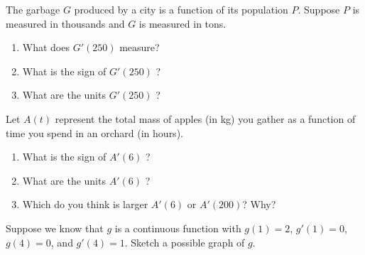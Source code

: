 \documentclass[11pt]{article}
\begin{document}
\vspace{0.2in}


The garbage $G$ produced by a city is a function of its population $P$.  Suppose $P$ is measured in thousands and
$G$ is measured in tons.  
\begin{enumerate}
\item{What does $G'(250)$ measure?}
\item{What is the sign of $G'(250)$ ?}
\item{What are the units $G'(250)$ ?}
\end{enumerate}


\vspace{0.2in}


Let $A(t)$ represent the total mass of apples (in kg) you gather as a function of time you spend in an orchard (in hours).
\begin{enumerate}
\item{What is the sign of $A'(6)$ ?}
\item{What are the units $A'(6)$ ?}
\item{Which do you think is larger $A'(6)$ or $A'(200)$?  Why? }
\end{enumerate}


\vspace{0.2in}

Suppose we know that $g$ is a continuous function with $g(1) = 2$, $g'(1) = 0$, $g(4) = 0$, and $g'(4) = 1 $.
Sketch a possible graph of $g$.
\end{document}
